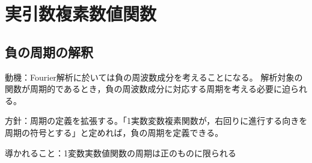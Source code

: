 \chapter{実引数複素数値関数}
    \section{負の周期の解釈}
        \noindent
        動機：Fourier解析に於いては負の周波数成分を考えることになる。
        解析対象の関数が周期的であるとき，負の周波数成分に対応する周期を考える必要に迫られる。
        \par\noindent
        方針：周期の定義を拡張する。「1実数変数複素関数が，右回りに進行する向きを周期の符号とする」と定めれば，負の周期を定義できる。
        \par\noindent
        導かれること：1変数実数値関数の周期は正のものに限られる
